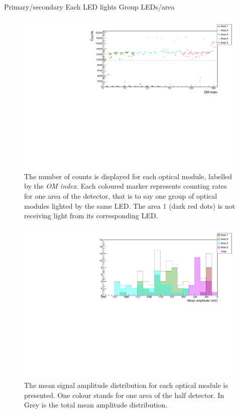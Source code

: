 Primary/secondary
Each LED lights
Group LEDs/area

\begin{figure}[h]
  \centering
  \includegraphics[width=15cm]{commissioning/fig_commissioning/LI_1d_counts.pdf}
  \caption{The number of counts is displayed for each optical module, labelled by the \emph{OM index}.
    Each coloured marker represents counting rates for one area of the detector, that is to say one group of optical modules lighted by the same LED.
    The area $1$ (dark red dots) is not receiving light from its corresponding LED.
    \label{fig:LI_counts}}
\end{figure}


\begin{figure}[h]
  \centering
  \includegraphics[width=15cm]{commissioning/fig_commissioning/LI_mean_ampl.pdf}
  \caption{The mean signal amplitude distribution for each optical module is presented.
    One colour stands for one area of the half detector.
    In Grey is the total mean amplitude distribution.
    \label{fig:LI_ampl}}
\end{figure}


